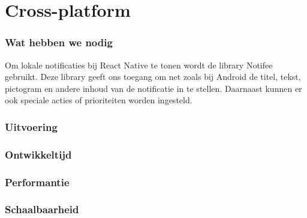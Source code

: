 

\clearpage
\section{Cross-platform}
\subsubsection{Wat hebben we nodig}
Om lokale notificaties bij React Native te tonen wordt de library Notifee gebruikt.
Deze library geeft ons toegang om net zoals bij Android de titel, tekst, pictogram en 
andere inhoud van de notificatie in te stellen. Daarnaast kunnen er ook speciale acties 
of prioriteiten worden ingesteld.

\subsubsection{Uitvoering}



\subsubsection{Ontwikkeltijd}



\subsubsection{Performantie}



\subsubsection{Schaalbaarheid}




